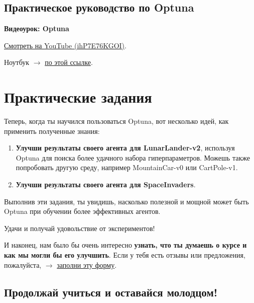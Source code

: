 \documentclass[11pt,a4paper]{article}
\begin{document}
\subsection{Практическое руководство по Optuna}

\begin{coursenote}
  \textbf{Видеоурок: Optuna}\par
  \href{https://www.youtube.com/watch?v=ihP7E76KGOI}{Смотреть на YouTube (ihP7E76KGOI)}.
\end{coursenote}

Ноутбук $\rightarrow$ \href{https://colab.research.google.com/github/araffin/tools-for-robotic-rl-icra2022/blob/main/notebooks/optuna_lab.ipynb}{по этой ссылке}.

\section{Практические задания}\label{hands-on}

Теперь, когда ты научился пользоваться Optuna, вот несколько идей, как применить полученные знания:

\begin{enumerate}[label=\textbf{\arabic*.},leftmargin=1.8em,itemsep=0.6em]
  \item \textbf{Улучши результаты своего агента для LunarLander-v2}, используя Optuna для поиска более удачного набора гиперпараметров. Можешь также попробовать другую среду, например MountainCar-v0 или CartPole-v1.
  \item \textbf{Улучши результаты своего агента для SpaceInvaders}.
\end{enumerate}

Выполнив эти задания, ты увидишь, насколько полезной и мощной может быть Optuna при обучении более эффективных агентов.

Удачи и получай удовольствие от экспериментов!

И наконец, нам было бы очень интересно \textbf{узнать, что ты думаешь о курсе и как мы могли бы его улучшить}. Если у тебя есть отзывы или предложения, пожалуйста, $\rightarrow$ \href{https://forms.gle/BzKXWzLAGZESGNaE9}{заполни эту форму}.

\subsection*{Продолжай учиться и оставайся молодцом!}
\end{document}
